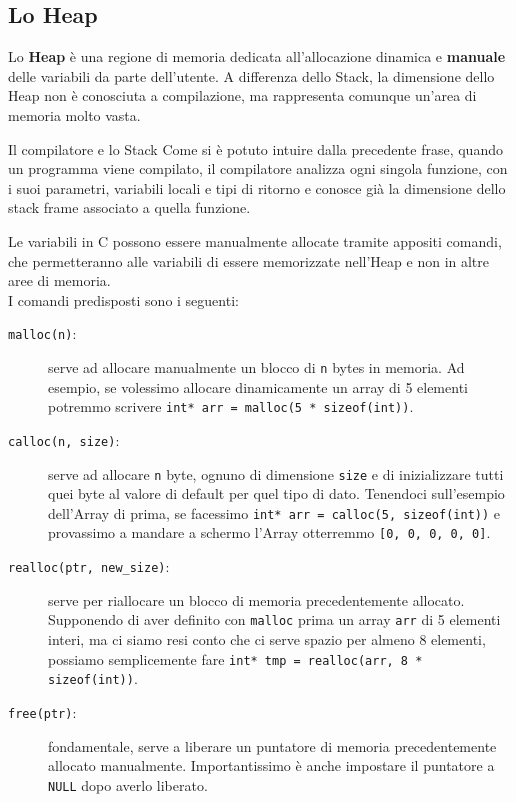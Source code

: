 \documentclass[12pt]{report}
\begin{document}
	\subsection{Lo Heap}
	Lo \textbf{Heap} è una regione di memoria dedicata all'allocazione dinamica e \textbf{manuale} delle variabili da parte dell'utente. A differenza dello Stack, la dimensione dello Heap non è conosciuta a compilazione, ma rappresenta comunque un'area di memoria molto vasta.
	\begin{osservazione}{Il compilatore e lo Stack}{}
		Come si è potuto intuire dalla precedente frase, quando un programma viene compilato, il compilatore analizza ogni singola funzione, con i suoi parametri, variabili locali e tipi di ritorno e conosce già la dimensione dello stack frame associato a quella funzione.
	\end{osservazione}
	Le variabili in C possono essere manualmente allocate tramite appositi comandi, che permetteranno alle variabili di essere memorizzate nell'Heap e non in altre aree di memoria.\\
	I comandi predisposti sono i seguenti:
	\begin{description}
		\item [\texttt{malloc(n)}:] serve ad allocare manualmente un blocco di \texttt{n} bytes in memoria. Ad esempio, se volessimo allocare dinamicamente un array di 5 elementi potremmo scrivere \texttt{int* arr = malloc(5 * sizeof(int))}.
		
		\item[\texttt{calloc(n, size)}:] serve ad allocare \texttt{n} byte, ognuno di dimensione \texttt{size} e di inizializzare tutti quei byte al valore di default per quel tipo di dato. Tenendoci sull'esempio dell'Array di prima, se facessimo \texttt{int* arr = calloc(5, sizeof(int))} e provassimo a mandare a schermo l'Array otterremmo \texttt{[0, 0, 0, 0, 0]}.
		
		\item[\texttt{realloc(ptr, new\_size)}:] serve per riallocare un blocco di memoria precedentemente allocato. Supponendo di aver definito con \texttt{malloc} prima un array \texttt{arr} di 5 elementi interi, ma ci siamo resi conto che ci serve spazio per almeno 8 elementi, possiamo semplicemente fare \texttt{int* tmp = realloc(arr, 8 * sizeof(int))}.
		
		\item[\texttt{free(ptr)}:] fondamentale, serve a liberare un puntatore di memoria precedentemente allocato manualmente. Importantissimo è anche impostare il puntatore a \texttt{NULL} dopo averlo liberato.
	\end{description}
	
\end{document}
